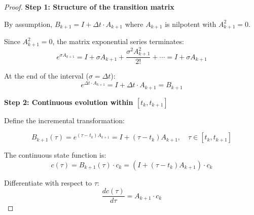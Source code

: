 \documentclass[11pt,a4paper]{article}
\theoremstyle{plain}
\theoremstyle{definition}
\begin{document}
\begin{proof}

\vspace{0.5em}

\textbf{Step 1: Structure of the transition matrix}

\vspace{0.5em}

By assumption, $B_{k+1} = I + \Delta t \cdot A_{k+1}$ where $A_{k+1}$ is nilpotent with $A_{k+1}^2 = 0$.

\vspace{0.5em}

Since $A_{k+1}^2 = 0$, the matrix exponential series terminates:
\begin{equation}
e^{\sigma A_{k+1}} = I + \sigma A_{k+1} + \frac{\sigma^2 A_{k+1}^2}{2!} + \cdots = I + \sigma A_{k+1}
\end{equation}

\vspace{0.5em}

At the end of the interval ($\sigma = \Delta t$):
\begin{equation}
e^{\Delta t \cdot A_{k+1}} = I + \Delta t \cdot A_{k+1} = B_{k+1}
\end{equation}

\vspace{0.5em}

\textbf{Step 2: Continuous evolution within $[t_k, t_{k+1}]$}

\vspace{0.5em}

Define the incremental transformation:

\vspace{0.5em}

\begin{equation}
B_{k+1}(\tau) = e^{(\tau - t_k) A_{k+1}} = I + (\tau - t_k) A_{k+1}, \quad \tau \in [t_k, t_{k+1}]
\end{equation}

\vspace{0.5em}

The continuous state function is:
\begin{equation}
c(\tau) = B_{k+1}(\tau) \cdot c_k = (I + (\tau - t_k) A_{k+1}) \cdot c_k
\label{eq:cont_state_app}
\end{equation}

\vspace{0.5em}

Differentiate with respect to $\tau$:
\begin{equation}
\frac{dc(\tau)}{d\tau} = A_{k+1} \cdot c_k
\label{eq:derivative_direct_app}
\end{equation}


\end{proof}
\end{document}

